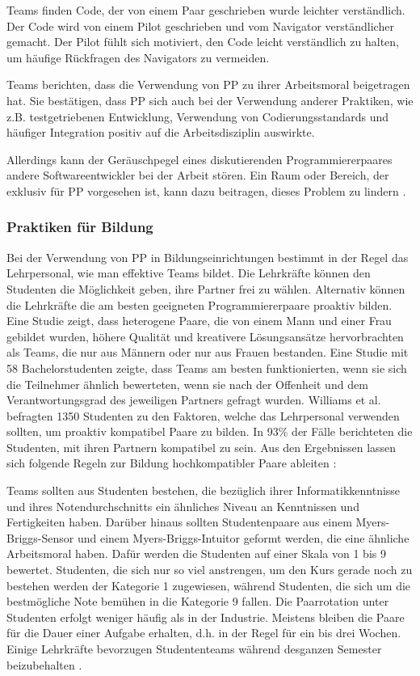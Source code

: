 Teams finden Code, der von einem Paar geschrieben wurde leichter verständlich. Der Code wird von einem Pilot geschrieben und vom Navigator verständlicher gemacht. Der Pilot fühlt sich motiviert, den Code leicht verständlich zu halten, um häufige Rückfragen des Navigators zu vermeiden.

Teams berichten, dass die Verwendung von PP zu ihrer Arbeitsmoral beigetragen hat. Sie bestätigen, dass PP sich auch bei der Verwendung anderer Praktiken, wie z.B. testgetriebenen Entwicklung, Verwendung von Codierungsstandards und häufiger Integration positiv auf die Arbeitsdisziplin auswirkte.


Allerdings kann der Geräuschpegel eines diskutierenden Programmiererpaares andere Softwareentwickler bei der Arbeit stören. Ein Raum oder Bereich, der exklusiv für PP vorgesehen ist, kann dazu beitragen, dieses Problem zu lindern \cite{Williams2010PairProgramming}.


\subsubsection{ Praktiken für Bildung} Bei der Verwendung von PP in Bildungseinrichtungen bestimmt in der Regel das Lehrpersonal, wie man effektive Teams bildet. Die Lehrkräfte können den Studenten die Möglichkeit geben, ihre Partner frei zu wählen. Alternativ können die Lehrkräfte die am besten geeigneten Programmiererpaare proaktiv bilden. Eine Studie zeigt, dass heterogene Paare, die von einem Mann und einer Frau gebildet wurden, höhere Qualität und kreativere Lösungsansätze hervorbrachten als Teams, die nur aus Männern oder nur aus Frauen bestanden. Eine Studie mit 58 Bachelorstudenten zeigte, dass Teams am besten funktionierten, wenn sie sich die Teilnehmer ähnlich bewerteten, wenn sie nach der Offenheit und dem Verantwortungsgrad des jeweiligen Partners gefragt wurden. Williams et al. \cite{Williams2006ExaminingProgrammers} befragten 1350 Studenten zu den Faktoren, welche das Lehrpersonal verwenden sollten, um proaktiv kompatibel Paare zu bilden. In 93\% der Fälle berichteten die Studenten, mit ihren Partnern kompatibel zu sein. Aus den Ergebnissen lassen sich folgende Regeln zur Bildung hochkompatibler Paare ableiten \cite{Williams2010PairProgramming}:

Teams sollten aus Studenten bestehen, die bezüglich ihrer Informatikkenntnisse und ihres Notendurchschnitts ein ähnliches Niveau an Kenntnissen und Fertigkeiten haben. Darüber hinaus sollten Studentenpaare  aus einem Myers-Briggs-Sensor und einem Myers-Briggs-Intuitor geformt werden, die eine ähnliche Arbeitsmoral haben. Dafür werden die Studenten auf einer Skala von 1 bis 9 bewertet. Studenten, die sich nur so viel anstrengen, um den Kurs gerade noch zu bestehen werden der Kategorie 1 zugewiesen, während Studenten, die sich um die bestmögliche Note bemühen in die Kategorie 9 fallen. Die Paarrotation unter Studenten erfolgt weniger häufig als in der Industrie. Meistens bleiben die Paare für die Dauer einer Aufgabe erhalten, d.h. in der Regel für ein bis drei Wochen. Einige Lehrkräfte bevorzugen Studententeams während desganzen Semester beizubehalten \cite{Williams2010PairProgramming}.


